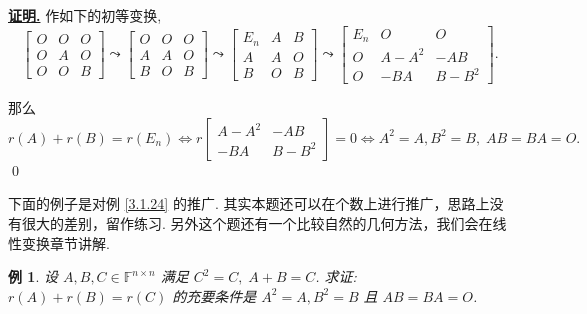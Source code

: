 \documentclass[10pt,openany]{article}
\theoremstyle{thmstyle} %
\theoremstyle{defstyle} %
\theoremstyle{prostyle} %
\theoremstyle{exastyle}
\newtheorem{example}[theorem]{例}
\theoremstyle{remstyle}
\renewenvironment{proof}[1][证明]{\par\underline{\textbf{#1.}} \;\fangsong}{\qed\par}
\newcommand{\F}{\mathbb{F}}
\newcommand{\n}{^{n \times n}}
\begin{document}
\begin{proof}
	作如下的初等变换,
	\[ \begin{bmatrix}
		O & O & O \\
		O & A & O \\
		O & O & B
	\end{bmatrix} \leadsto  \begin{bmatrix}
	O & O & O \\
	A & A & O \\
	B & O & B
	\end{bmatrix} \leadsto  \begin{bmatrix}
	E_n & A & B \\
	A & A & O \\
	B & O & B
	\end{bmatrix} \leadsto \begin{bmatrix}
	E_n & O & O \\
	O & A-A^2 & -AB \\
	O & -BA & B-B^2
	\end{bmatrix}. \]
	
	那么
	\[ r(A) + r(B) = r(E_n) \Leftrightarrow r\begin{bmatrix}
		A-A^2 & -AB \\
		-BA & B-B^2
	\end{bmatrix}=0 \Leftrightarrow A^2 = A, B^2 = B, \; AB = BA = O. \]
\end{proof}

下面的例子是对例 \ref{3.1.24} 的推广. 其实本题还可以在个数上进行推广，思路上没有很大的差别，留作练习. 另外这个题还有一个比较自然的几何方法，我们会在线性变换章节讲解.


\begin{example} \label{3.1.25}
	设 \(  A, B, C \in \F\n \) 满足 \( C^2=C, \; A + B = C \). 求证: \( r(A) + r(B) = r(C) \) 的充要条件是  
	\( A^2 = A, B^2 = B \) 且 \( AB = BA = O \).
\end{example}
\end{document}

